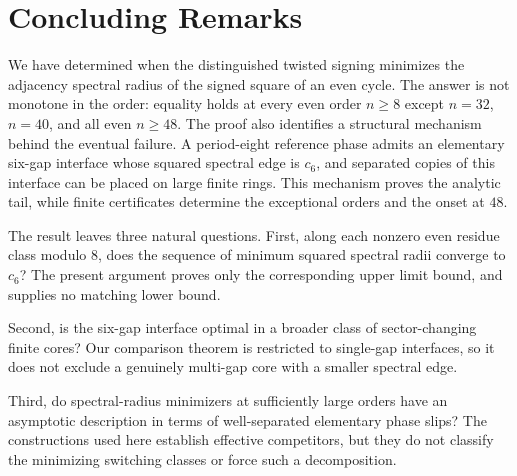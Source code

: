 \section{Concluding Remarks}
\label{sec:concluding}

We have determined when the distinguished twisted signing minimizes
the adjacency spectral radius of the signed square of an even cycle.  The
answer is not monotone in the order: equality holds at every even order
$n\geq 8$ except $n=32$, $n=40$, and all even $n\geq 48$.  The proof also
identifies a structural mechanism behind the eventual failure.  A
period-eight reference phase admits an elementary six-gap interface whose
squared spectral edge is $c_6$, and separated copies of this interface can be
placed on large finite rings.  This mechanism proves the analytic tail, while
finite certificates determine the exceptional orders and the onset at
$48$.

The result leaves three natural questions.  First, along each nonzero even
residue class modulo $8$, does the sequence of minimum squared spectral radii
converge to $c_6$?  The present argument proves only the corresponding upper
limit bound, and supplies no matching lower bound.

Second, is the six-gap interface optimal in a broader class of
sector-changing finite cores?  Our comparison theorem is restricted to
single-gap interfaces, so it does not exclude a genuinely multi-gap core with
a smaller spectral edge.

Third, do spectral-radius minimizers at sufficiently large orders have an
asymptotic description in terms of well-separated elementary phase slips?
The constructions used here establish effective competitors, but they do not
classify the minimizing switching classes or force such a decomposition.
